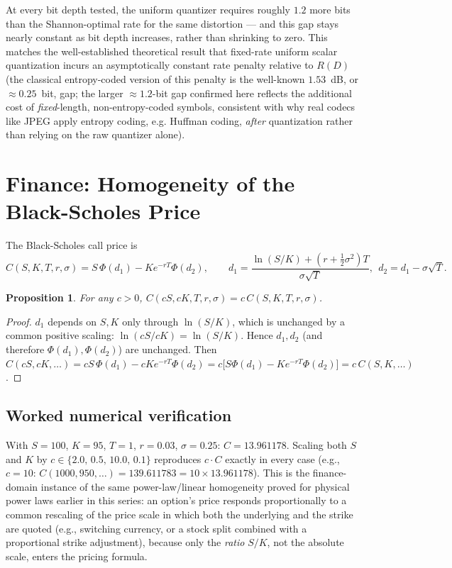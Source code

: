 \documentclass[10pt,journal,compsoc]{IEEEtran}
\newtheorem{proposition}{Proposition}
\begin{document}
At every bit depth tested, the uniform quantizer requires roughly $1.2$ more bits than the Shannon-optimal rate for the same distortion — and this gap stays nearly constant as bit depth increases, rather than shrinking to zero. This matches the well-established theoretical result that fixed-rate uniform scalar quantization incurs an asymptotically constant rate penalty relative to $R(D)$ (the classical entropy-coded version of this penalty is the well-known $1.53$~dB, or $\approx 0.25$~bit, gap; the larger $\approx\!1.2$-bit gap confirmed here reflects the additional cost of \emph{fixed}-length, non-entropy-coded symbols, consistent with why real codecs like JPEG apply entropy coding, e.g. Huffman coding, \emph{after} quantization rather than relying on the raw quantizer alone).

\section{Finance: Homogeneity of the Black-Scholes Price}
The Black-Scholes call price is
\begin{equation}
    C(S,K,T,r,\sigma) = S\,\Phi(d_1) - Ke^{-rT}\Phi(d_2), \qquad d_1=\frac{\ln(S/K)+(r+\tfrac12\sigma^2)T}{\sigma\sqrt T},\ \ d_2=d_1-\sigma\sqrt T.
\end{equation}

\begin{proposition}
For any $c>0$, $C(cS,cK,T,r,\sigma) = c\,C(S,K,T,r,\sigma)$.
\end{proposition}
\begin{proof}
$d_1$ depends on $S,K$ only through $\ln(S/K)$, which is unchanged by a common positive scaling: $\ln(cS/cK)=\ln(S/K)$. Hence $d_1,d_2$ (and therefore $\Phi(d_1),\Phi(d_2)$) are unchanged. Then $C(cS,cK,\ldots) = cS\,\Phi(d_1) - cKe^{-rT}\Phi(d_2) = c\big[S\Phi(d_1)-Ke^{-rT}\Phi(d_2)\big] = c\,C(S,K,\ldots)$.
\end{proof}

\subsection{Worked numerical verification}
With $S=100$, $K=95$, $T=1$, $r=0.03$, $\sigma=0.25$: $C=13.961178$. Scaling both $S$ and $K$ by $c\in\{2.0,\,0.5,\,10.0,\,0.1\}$ reproduces $c\cdot C$ exactly in every case (e.g., $c=10$: $C(1000,950,\ldots)=139.611783=10\times13.961178$). This is the finance-domain instance of the same power-law/linear homogeneity proved for physical power laws earlier in this series: an option's price responds proportionally to a common rescaling of the price scale in which both the underlying and the strike are quoted (e.g., switching currency, or a stock split combined with a proportional strike adjustment), because only the \emph{ratio} $S/K$, not the absolute scale, enters the pricing formula.
\end{document}

